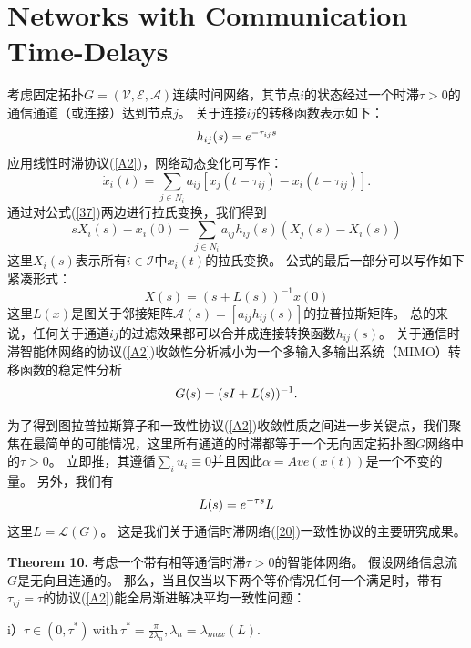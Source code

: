\documentclass{article}
\begin{document}
\section{Networks with Communication Time-Delays}
考虑固定拓扑$G=(\mathcal{V}, \mathcal{E}, \mathcal{A})$连续时间网络，其节点$i$的状态经过一个时滞$\tau > 0$的通信通道（或连接）达到节点$j$。
关于连接$ij$的转移函数表示如下：
\begin{equation}
    h_{ij}(s) = e^{-\tau_{ij}s}
    \notag
\end{equation}
应用线性时滞协议(\ref{A2})，网络动态变化可写作：
\begin{equation}
    \dot{x}_i(t) = \sum_{j\in N_i} a_{ij} [x_j(t-\tau_{ij}) - x_i(t-\tau_{ij})].
    \tag{37}
    \label{37}
\end{equation}
通过对公式(\ref{37})两边进行拉氏变换，我们得到
\begin{equation}
    sX_i(s) - x_i(0) = \sum_{j\in N_i} a_{ij} h_{ij}(s) (X_j(s) - X_i(s))
    \tag{38}
    \label{38}
\end{equation}
这里$X_i(s)$表示所有$i\in \mathcal{I}$中$x_i(t)$的拉氏变换。
公式的最后一部分可以写作如下紧凑形式：
\begin{equation}
    X(s) = (s+L(s))^{-1}x(0)
    \tag{39}
    \label{39}
\end{equation}
这里$L(x)$是图关于邻接矩阵$\mathcal{A}(s) = [a_{ij}h_{ij}(s)]$的拉普拉斯矩阵。
总的来说，任何关于通道$ij$的过滤效果都可以合并成连接转换函数$h_{ij}(s)$。
关于通信时滞智能体网络的协议(\ref{A2})收敛性分析减小为一个多输入多输出系统（MIMO）转移函数的稳定性分析
\begin{equation}
    G(s) = (sI+L(s))^{-1}.
    \notag
\end{equation}

为了得到图拉普拉斯算子和一致性协议(\ref{A2})收敛性质之间进一步关键点，我们聚焦在最简单的可能情况，这里所有通道的时滞都等于一个无向固定拓扑图$G$网络中的$\tau > 0$。
立即推，其遵循$\sum_i u_i \equiv 0$并且因此$\alpha = Ave(x(t))$是一个不变的量。
另外，我们有
\begin{equation}
    L(s) = e^{-\tau s}L
    \notag
\end{equation}
这里$L=\mathcal{L}(G)$。
这是我们关于通信时滞网络(\ref{20})一致性协议的主要研究成果。

\noindent \textbf{Theorem 10.} 考虑一个带有相等通信时滞$\tau > 0$的智能体网络。
假设网络信息流$G$是无向且连通的。
那么，当且仅当以下两个等价情况任何一个满足时，带有$\tau_{ij} = \tau$的协议(\ref{A2})能全局渐进解决平均一致性问题：

i）$\tau \in (0, \tau^*)\ \text{with}\ \tau^*=\frac{\pi}{2\lambda_n}, \lambda_n=\lambda_{max}(L)$.
\end{document}
